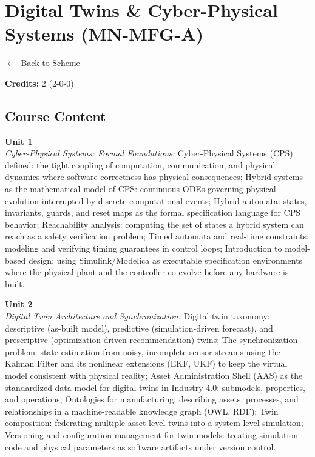 \section*{Digital Twins \& Cyber-Physical Systems (MN-MFG-A)}
\label{minor:MFG_L2}

\noindent \small{\hyperref[main:scheme]{$\leftarrow$ Back to Scheme}} \vspace{0.5cm}

\noindent \textbf{Credits:} 2 (2-0-0)

\subsection*{Course Content}
\noindent\textbf{Unit 1} \\
\textit{Cyber-Physical Systems: Formal Foundations:} Cyber-Physical Systems (CPS) defined: the tight coupling of computation, communication, and physical dynamics where software correctness has physical consequences; Hybrid systems as the mathematical model of CPS: continuous ODEs governing physical evolution interrupted by discrete computational events; Hybrid automata: states, invariants, guards, and reset maps as the formal specification language for CPS behavior; Reachability analysis: computing the set of states a hybrid system can reach as a safety verification problem; Timed automata and real-time constraints: modeling and verifying timing guarantees in control loops; Introduction to model-based design: using Simulink/Modelica as executable specification environments where the physical plant and the controller co-evolve before any hardware is built.

\vspace{0.3cm}

\noindent\textbf{Unit 2} \\
\textit{Digital Twin Architecture and Synchronization:} Digital twin taxonomy: descriptive (as-built model), predictive (simulation-driven forecast), and prescriptive (optimization-driven recommendation) twins; The synchronization problem: state estimation from noisy, incomplete sensor streams using the Kalman Filter and its nonlinear extensions (EKF, UKF) to keep the virtual model consistent with physical reality; Asset Administration Shell (AAS) as the standardized data model for digital twins in Industry 4.0: submodels, properties, and operations; Ontologies for manufacturing: describing assets, processes, and relationships in a machine-readable knowledge graph (OWL, RDF); Twin composition: federating multiple asset-level twins into a system-level simulation; Versioning and configuration management for twin models: treating simulation code and physical parameters as software artifacts under version control.

